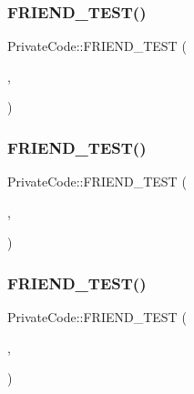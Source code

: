 \mbox{\label{class_private_code_a9a74a333501232539ab1636f0928d8f2}} 
\subsubsection{\texorpdfstring{FRIEND\_TEST()}{FRIEND\_TEST()}\hspace{0.1cm}{\footnotesize\ttfamily [3/6]}}
{\footnotesize\ttfamily Private\+Code\+::\+F\+R\+I\+E\+N\+D\+\_\+\+T\+E\+ST (\begin{DoxyParamCaption}\item[{Private\+Code\+Test}]{,  }\item[{Can\+Access\+Private\+Members}]{ }\end{DoxyParamCaption})}

\mbox{\label{class_private_code_a29b6823300f68d78691476eeeaed8a7c}} 
\subsubsection{\texorpdfstring{FRIEND\_TEST()}{FRIEND\_TEST()}\hspace{0.1cm}{\footnotesize\ttfamily [4/6]}}
{\footnotesize\ttfamily Private\+Code\+::\+F\+R\+I\+E\+N\+D\+\_\+\+T\+E\+ST (\begin{DoxyParamCaption}\item[{\mbox{\hyperlink{googletest-master_2googletest_2test_2gtest__prod__test_8cc_a89debba10c803e339ce0f9b0b34a2267}{Private\+Code\+Fixture\+Test}}}]{,  }\item[{Can\+Access\+Private\+Members}]{ }\end{DoxyParamCaption})}

\mbox{\label{class_private_code_a29b6823300f68d78691476eeeaed8a7c}} 
\subsubsection{\texorpdfstring{FRIEND\_TEST()}{FRIEND\_TEST()}\hspace{0.1cm}{\footnotesize\ttfamily [5/6]}}
{\footnotesize\ttfamily Private\+Code\+::\+F\+R\+I\+E\+N\+D\+\_\+\+T\+E\+ST (\begin{DoxyParamCaption}\item[{\mbox{\hyperlink{googletest-master_2googletest_2test_2gtest__prod__test_8cc_a89debba10c803e339ce0f9b0b34a2267}{Private\+Code\+Fixture\+Test}}}]{,  }\item[{Can\+Access\+Private\+Members}]{ }\end{DoxyParamCaption})}

